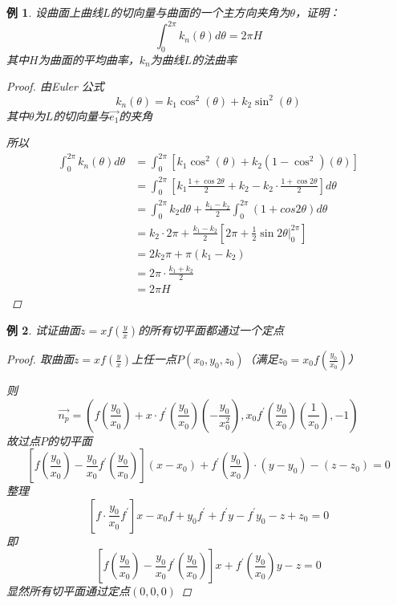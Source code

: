 \documentclass{article}                     %
\numberwithin{equation}{section}            %
\numberwithin{figure}{section}              %
\numberwithin{table}{section}               %
\newtheorem{example}{\indent 例}[section]
\begin{document}
\begin{example}
    设曲面上曲线$L$的切向量与曲面的一个主方向夹角为$\theta$，证明：
    $$\int_0^{2\pi}k_n(\theta)d\theta=2\pi H$$
    其中$H$为曲面的平均曲率，$k_n$为曲线$L$的法曲率
    \begin{proof}
        由Euler 公式
        $$k_n(\theta)=k_1\cos^2(\theta)+k_2\sin^2(\theta)$$
        其中$\theta$为$L$的切向量与$\vec{e_1}$的夹角

        所以
        \begin{equation*}
            \begin{aligned}
                \int_0^{2\pi}k_n(\theta)d\theta &=\int_0^{2\pi}[k_1\cos^2(\theta)+k_2(1-\cos^2)(\theta)]\\
                &=\int_0^{2\pi}[k_1\frac{1+\cos{2\theta}}{2}+k_2-k_2\cdot \frac{1+\cos{2\theta}}{2}]d\theta\\
                &=\int_0^{2\pi}k_2d\theta +\frac{k_1-k_2}{2}\int_0^{2\pi}(1+cos{2\theta})d\theta\\
                &=k_2\cdot 2\pi+\frac{k_1-k_2}{2}[2\pi+\frac{1}{2}\sin{2\theta}|_0^{2\pi}]\\
                &=2k_2\pi+\pi(k_1-k_2)\\
                &=2\pi\cdot \frac{k_1+k_2}{2}\\
                &=2\pi H
            \end{aligned}
        \end{equation*}
    \end{proof}
\end{example}






\begin{example}
    试证曲面$z=xf(\frac{y}{x})$的所有切平面都通过一个定点
    \begin{proof}
        取曲面$z=xf(\frac{y}{x})$上任一点$P(x_0,y_0,z_0)$（满足$z_0=x_0f(\frac{y_0}{x_0})$）

        则
        $$\vec{n_p}=(f(\frac{y_0}{x_0})+x\cdot f^{\prime}(\frac{y_0}{x_0})(-\frac{y_0}{x_0^2}),x_0f^{\prime}(\frac{y_0}{x_0})(\frac{1}{x_0}),-1)$$
        故过点$P$的切平面
        $$[f(\frac{y_0}{x_0})-\frac{y_0}{x_0}f^{\prime}(\frac{y_0}{x_0})](x-x_0)+f^{\prime}(\frac{y_0}{x_0})\cdot (y-y_0)-(z-z_0)=0$$
        整理
        $$[f\cdot\frac{y_0}{x_0}f^{\prime}]x-x_0f+y_0f^{\prime}+f^{\prime}y-f^{\prime}y_0-z+z_0=0$$
        即
        $$[f(\frac{y_0}{x_0})-\frac{y_0}{x_0}f^{\prime}(\frac{y_0}{x_0})]x+f^{\prime}(\frac{y_0}{x_0})y-z=0$$
        显然所有切平面通过定点$(0,0,0)$
    \end{proof}
\end{example}
\end{document}
